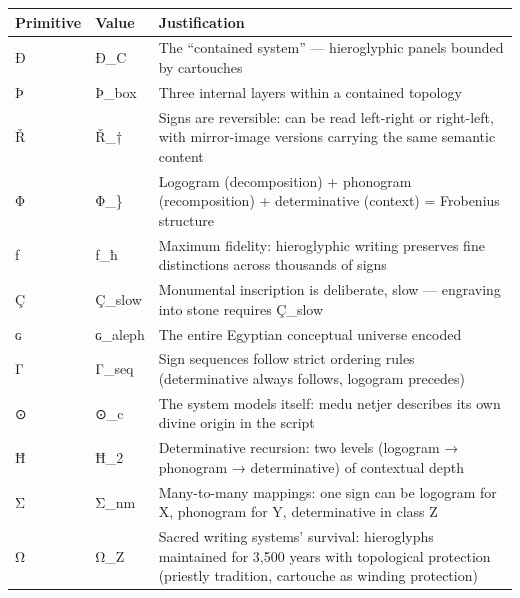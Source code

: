 {\def\LTcaptype{none} %
\begin{longtable}[]{@{}
  >{\raggedright\arraybackslash}p{}
  >{\raggedright\arraybackslash}p{}
  >{\raggedright\arraybackslash}p{}@{}}
\toprule\noalign{}
\begin{minipage}[b]{\linewidth}\raggedright
Primitive
\end{minipage} & \begin{minipage}[b]{\linewidth}\raggedright
Value
\end{minipage} & \begin{minipage}[b]{\linewidth}\raggedright
Justification
\end{minipage} \\
\midrule\noalign{}
\endhead
\bottomrule\noalign{}
\endlastfoot
Ð & Ð\_C & The ``contained system'' --- hieroglyphic panels bounded by
cartouches \\
Þ & Þ\_box & Three internal layers within a contained topology \\
Ř & Ř\_† & Signs are reversible: can be read left-right or right-left,
with mirror-image versions carrying the same semantic content \\
Φ & Φ\_\} & Logogram (decomposition) + phonogram (recomposition) +
determinative (context) = Frobenius structure \\
ƒ & ƒ\_ħ & Maximum fidelity: hieroglyphic writing preserves fine
distinctions across thousands of signs \\
Ç & Ç\_slow & Monumental inscription is deliberate, slow --- engraving
into stone requires Ç\_slow \\
ɢ & ɢ\_aleph & The entire Egyptian conceptual universe encoded \\
Γ & Γ\_seq & Sign sequences follow strict ordering rules (determinative
always follows, logogram precedes) \\
⊙ & ⊙\_c & The system models itself: medu netjer describes its own
divine origin in the script \\
Ħ & Ħ\_2 & Determinative recursion: two levels (logogram → phonogram →
determinative) of contextual depth \\
Σ & Σ\_nm & Many-to-many mappings: one sign can be logogram for X,
phonogram for Y, determinative in class Z \\
Ω & Ω\_Z & Sacred writing systems' survival: hieroglyphs maintained for
3,500 years with topological protection (priestly tradition, cartouche
as winding protection) \\
\end{longtable}
}

